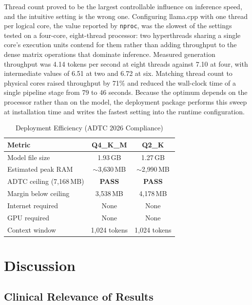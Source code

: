 \documentclass[journal]{IEEEtran}
\begin{document}
Thread count proved to be the largest controllable influence on
inference speed, and the intuitive setting is the wrong one.
Configuring llama.cpp with one thread per logical core, the value
reported by \texttt{nproc}, was the slowest of the settings tested on a
four-core, eight-thread processor: two hyperthreads sharing a single
core's execution units contend for them rather than adding throughput
to the dense matrix operations that dominate inference. Measured
generation throughput was 4.14 tokens per second at eight threads
against 7.10 at four, with intermediate values of 6.51 at two and 6.72
at six. Matching thread count to physical cores raised throughput by
71\% and reduced the wall-clock time of a single pipeline stage from 79
to 46 seconds. Because the optimum depends on the processor rather than
on the model, the deployment package performs this sweep at
installation time and writes the fastest setting into the runtime
configuration.

\begin{table}[h!]
\centering
\caption{Deployment Efficiency (ADTC 2026 Compliance)}
\label{tab:efficiency}
\begin{tabular}{lcc}
\toprule
\textbf{Metric} & \textbf{Q4\_K\_M} & \textbf{Q2\_K} \\
\midrule
Model file size           & 1.93\,GB & 1.27\,GB \\
Estimated peak RAM        & $\sim$3{,}630\,MB & $\sim$2{,}990\,MB \\
ADTC ceiling (7{,}168\,MB)& \textbf{PASS} & \textbf{PASS} \\
Margin below ceiling      & 3{,}538\,MB & 4{,}178\,MB \\
Internet required         & None & None \\
GPU required              & None & None \\
Context window            & 1{,}024 tokens & 1{,}024 tokens \\
\bottomrule
\end{tabular}
\end{table}

\section{Discussion}
\label{sec:discussion}

\subsection{Clinical Relevance of Results}
\end{document}

